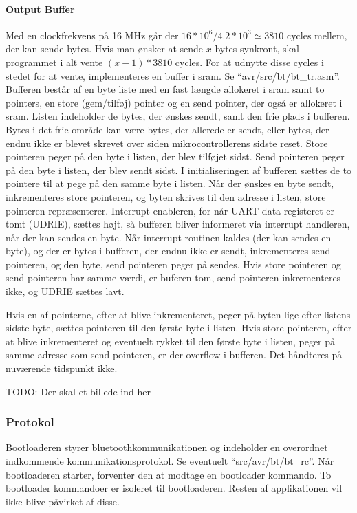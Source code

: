 \paragraph{Output Buffer}
Med en clockfrekvens på 16 MHz går der $16*10^6 / 4.2*10^3 \simeq 3810$ cycles mellem, der kan sende bytes. Hvis man ønsker at sende $x$ bytes synkront, skal programmet i alt vente $(x-1)*3810$ cycles. For at udnytte disse cycles i stedet for at vente, implementeres en buffer i sram.
Se ``avr/src/bt/bt\_tr.asm''.
Bufferen består af en byte liste med en fast længde allokeret i sram samt to pointers, en store (gem/tilføj) pointer og en send pointer, der også er allokeret i sram. Listen indeholder de bytes, der ønskes sendt, samt den frie plads i bufferen. Bytes i det frie område kan være bytes, der allerede er sendt, eller bytes, der endnu ikke er blevet skrevet over siden mikrocontrollerens sidste reset. Store pointeren peger på den byte i listen, der blev tilføjet sidst. Send pointeren peger på den byte i listen, der blev sendt sidst.
I initialiseringen af bufferen sættes de to pointere til at pege på den samme byte i listen.
Når der ønskes en byte sendt, inkrementeres store pointeren, og byten skrives til den adresse i listen, store pointeren repræsenterer. Interrupt enableren, for når UART data registeret er tomt (UDRIE), sættes højt, så bufferen bliver informeret via interrupt handleren, når der kan sendes en byte.
Når interrupt routinen kaldes (der kan sendes en byte), og der er bytes i bufferen, der endnu ikke er sendt, inkrementeres send pointeren, og den byte, send pointeren peger på sendes. Hvis store pointeren og send pointeren har samme værdi, er buferen tom, send pointeren inkrementeres ikke, og UDRIE sættes lavt.

Hvis en af pointerne, efter at blive inkrementeret, peger på byten lige efter listens sidste byte, sættes pointeren til den første byte i listen.
Hvis store pointeren, efter at blive inkrementeret og eventuelt rykket til den første byte i listen, peger på samme adresse som send pointeren, er der overflow i bufferen. Det håndteres på nuværende tidspunkt ikke.

TODO: Der skal et billede ind her

\subsubsection{Protokol}
Bootloaderen styrer bluetoothkommunikationen og indeholder en overordnet indkommende kommunikationsprotokol.
Se eventuelt ``src/avr/bt/bt\_rc''.
Når bootloaderen starter, forventer den at modtage en bootloader kommando.
To bootloader kommandoer er isoleret til bootloaderen. Resten af applikationen vil ikke blive påvirket af disse.


